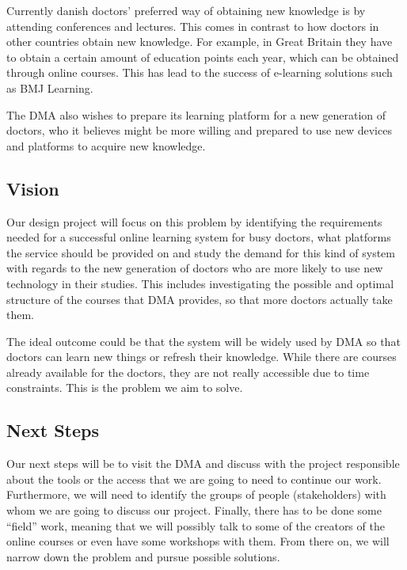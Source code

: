 Currently danish doctors’ preferred way of obtaining new knowledge is by attending conferences and lectures. This comes in contrast to how doctors in other countries obtain new knowledge. For example, in Great Britain they have to obtain a certain amount of education points each year, which can be obtained through online courses. This has lead to the success of e-learning solutions such as BMJ Learning.

The DMA also wishes to prepare its learning platform for a new generation of doctors, who it believes might be more willing and prepared to use new devices and platforms to acquire new knowledge.

\subsection{Vision}
Our design project will focus on this problem by identifying the requirements needed for a successful online learning system for busy doctors, what platforms the service should be provided on and study the demand for this kind of system with regards to the new generation of doctors who are more likely to use new technology in their studies. This includes investigating the possible and optimal structure of the courses that DMA provides, so that more doctors actually take them.

The ideal outcome could be that the system will be widely used by DMA so that doctors can learn new things or refresh their knowledge. While there are courses already available for the doctors, they are not really accessible due to time constraints. This is the problem we aim to solve.

\subsection{Next Steps}
Our next steps will be to visit the DMA and discuss with the project responsible about the tools or the access that we are going to need to continue our work. Furthermore, we will need to identify the groups of people (stakeholders) with whom we are going to discuss our project. Finally, there has to be done some “field” work, meaning that we will possibly talk to some of the creators of the online courses or even have some workshops with them. From there on, we will narrow down the problem and pursue possible solutions.


